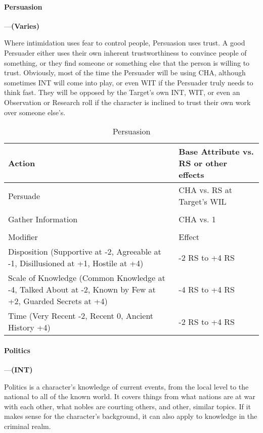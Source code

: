 \documentclass[oneside,11pt,english]{book}
\begin{document}
\paragraph{\label{skill:Persuasion}Persuasion}---\quad\textbf{(Varies)}\par
Where intimidation uses fear to control people, Persuasion uses trust. A good Persuader either uses their own inherent trustworthiness to convince people of something, or they find someone or something else that the person is willing to trust. Obviously, most of the time the Persuader will be using CHA, although sometimes INT will come into play, or even WIT if the Persuader truly needs to think fast. They will be opposed by the Target’s own INT, WIT, or even an Observation or Research roll if the character is inclined to trust their own work over someone else’s.


\begin{longtabu} to \linewidth{X[1.5]X[r]}
	\caption{Persuasion}
	\label{tab:Persuasion}\\
	\rowfont[c]{}Action &Base Attribute vs. RS or other effects\\\toprule
Persuade &CHA vs. RS at Target’s WIL \\
	\\
Gather Information &CHA vs. 1\\
	\\
		\rowfont[c]{} Modifier & Effect\\\cmidrule(lr){1-2} 
Disposition (Supportive at -2, Agreeable at -1, Disillusioned at +1, Hostile at +4)&-2 RS to +4 RS\\
Scale of Knowledge (Common Knowledge at -4, Talked About at -2, Known by Few at +2, Guarded Secrets at +4) &-4 RS to +4 RS\\
Time (Very Recent -2, Recent 0, Ancient History +4) &-2 RS to +4 RS\\ 
\end{longtabu}
\paragraph{\label{skill:Politics}Politics}---\quad\textbf{(INT) }\par
Politics is a character’s knowledge of current events, from the local level to the national to all of the known world. It covers things from what nations are at war with each other, what nobles are courting others, and other, similar topics. If it makes sense for the character’s background, it can also apply to knowledge in the criminal realm.
\end{document}
